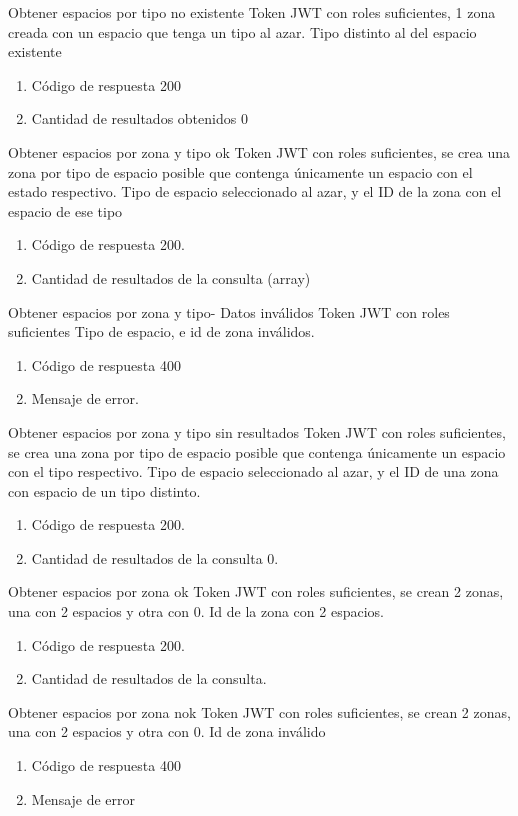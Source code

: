 {Obtener espacios por tipo no existente}
{Token JWT con roles suficientes, 1 zona creada con un espacio que tenga un tipo al azar.}
{Tipo distinto al del espacio existente}
{\begin{enumerate} [leftmargin=*, nosep]
    \item Código de respuesta 200
    \item Cantidad de resultados obtenidos 0
\end{enumerate}}

{Obtener espacios por zona y tipo ok}
{Token JWT con roles suficientes, se crea una zona por tipo de espacio posible que contenga únicamente un espacio con el estado respectivo.}
{Tipo de espacio seleccionado al azar, y el ID de la zona con el espacio de ese tipo}
{\begin{enumerate} [leftmargin=*, nosep]
    \item Código de respuesta 200.
    \item Cantidad de resultados de la consulta (array)
\end{enumerate}}

{Obtener espacios por zona y tipo- Datos inválidos}
{Token JWT con roles suficientes}
{Tipo de espacio, e id de zona inválidos.}
{\begin{enumerate} [leftmargin=*, nosep]
    \item Código de respuesta 400
    \item Mensaje de error.
\end{enumerate}}

{Obtener espacios por zona y tipo sin resultados}
{Token JWT con roles suficientes, se crea una zona por tipo de espacio posible que contenga únicamente un espacio con el tipo respectivo.}
{Tipo de espacio seleccionado al azar, y el ID de una zona con espacio de un tipo distinto.}
{\begin{enumerate} [leftmargin=*, nosep]
    \item Código de respuesta 200.
    \item Cantidad de resultados de la consulta 0.
\end{enumerate}}

{Obtener espacios por zona ok}
{Token JWT con roles suficientes, se crean 2 zonas, una con 2 espacios y otra con 0.}
{Id de la zona con 2 espacios.}
{\begin{enumerate} [leftmargin=*, nosep]
    \item Código de respuesta 200.
    \item Cantidad de resultados de la consulta.
\end{enumerate}}

{Obtener espacios por zona nok}
{Token JWT con roles suficientes, se crean 2 zonas, una con 2 espacios y otra con 0.}
{Id de zona inválido}
{\begin{enumerate} [leftmargin=*, nosep]
    \item Código de respuesta 400
    \item Mensaje de error
\end{enumerate}}

